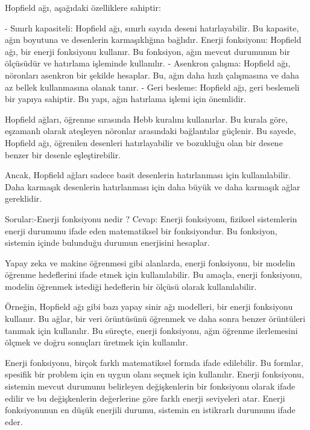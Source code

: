 \documentclass[11pt]{article}
\begin{document}
Hopfield ağı, aşağıdaki özelliklere sahiptir:

    - Sınırlı kapasiteli: Hopfield ağı, sınırlı sayıda deseni hatırlayabilir. 
    Bu kapasite, ağın boyutuna ve desenlerin karmaşıklığına bağlıdır.
    Enerji fonksiyonu: Hopfield ağı, bir enerji fonksiyonu kullanır. Bu fonksiyon, ağın mevcut durumunun bir ölçüsüdür ve hatırlama işleminde kullanılır.\newline
    - Asenkron çalışma: Hopfield ağı, nöronları asenkron bir şekilde hesaplar. Bu, ağın daha hızlı çalışmasına ve daha az bellek kullanmasına olanak tanır.\newline
   - Geri besleme: Hopfield ağı, geri beslemeli bir yapıya sahiptir. Bu yapı, ağın hatırlama işlemi için önemlidir.

Hopfield ağları, öğrenme sırasında Hebb kuralını kullanırlar. Bu kurala göre, eşzamanlı olarak ateşleyen nöronlar arasındaki bağlantılar güçlenir. Bu sayede, Hopfield ağı, öğrenilen desenleri hatırlayabilir ve bozukluğu olan bir desene benzer bir desenle eşleştirebilir.

Ancak, Hopfield ağları sadece basit desenlerin hatırlanması için kullanılabilir. Daha karmaşık desenlerin hatırlanması için daha büyük ve daha karmaşık ağlar gereklidir.

Sorular:-Enerji fonksiyonu nedir ?\newline
Cevap: Enerji fonksiyonu, fiziksel sistemlerin enerji durumunu ifade eden matematiksel bir fonksiyondur. Bu fonksiyon, sistemin içinde bulunduğu durumun enerjisini hesaplar.

Yapay zeka ve makine öğrenmesi gibi alanlarda, enerji fonksiyonu, bir modelin öğrenme hedeflerini ifade etmek için kullanılabilir. Bu amaçla, enerji fonksiyonu, modelin öğrenmek istediği hedeflerin bir ölçüsü olarak kullanılabilir.

Örneğin, Hopfield ağı gibi bazı yapay sinir ağı modelleri, bir enerji fonksiyonu kullanır. Bu ağlar, bir veri örüntüsünü öğrenmek ve daha sonra benzer örüntüleri tanımak için kullanılır. Bu süreçte, enerji fonksiyonu, ağın öğrenme ilerlemesini ölçmek ve doğru sonuçları üretmek için kullanılır.

Enerji fonksiyonu, birçok farklı matematiksel formda ifade edilebilir. Bu formlar, spesifik bir problem için en uygun olanı seçmek için kullanılır. Enerji fonksiyonu, sistemin mevcut durumunu belirleyen değişkenlerin bir fonksiyonu olarak ifade edilir ve bu değişkenlerin değerlerine göre farklı enerji seviyeleri atar. Enerji fonksiyonunun en düşük enerjili durumu, sistemin en istikrarlı durumunu ifade eder.
\end{document}
